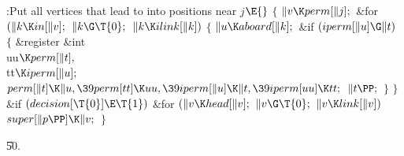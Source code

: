 \B{}:Put all vertices that lead to  into positions
near $j$\X${}\E{}$\6
${}\{{}$\1\6
${}\|v\K\\{perm}[\|j];{}$\6
\&{for} ${}(\|k\K\\{in}[\|v];{}$ ${}\|k\G\T{0};{}$ ${}\|k\K\\{ilink}[\|k]){}$\5
${}\{{}$\1\6
${}\|u\K\\{aboard}[\|k];{}$\6
\&{if} ${}(\\{iperm}[\|u]\G\|t){}$\5
${}\{{}$\1\6
\&{register} \&{int} \\{uu}${}\K\\{perm}[\|t],{}$ \\{tt}${}\K\\{iperm}[\|u];{}$%
\7
${}\\{perm}[\|t]\K\|u,\39\\{perm}[\\{tt}]\K\\{uu},\39\\{iperm}[\|u]\K\|t,\39%
\\{iperm}[\\{uu}]\K\\{tt};{}$\6
${}\|t\PP;{}$\6
\4${}\}{}$\2\6
\4${}\}{}$\2\6
\&{if} ${}(\\{decision}[\T{0}]\E\T{1}){}$\1\6
\&{for} ${}(\|v\K\\{head}[\|v];{}$ ${}\|v\G\T{0};{}$ ${}\|v\K\\{link}[\|v]){}$%
\1\5
${}\\{super}[\|p\PP]\K\|v;{}$\2\2\6
\4${}\}{}$\2\par
\U50.\fi

